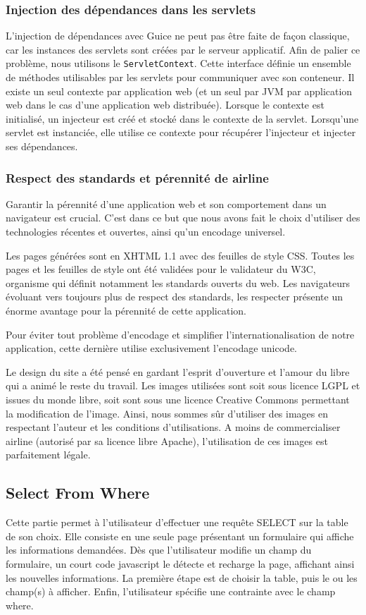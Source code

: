 \subsubsection{Injection des dépendances dans les servlets}
L'injection de dépendances avec Guice ne peut pas être faite de façon classique, car les instances des servlets sont créées par le serveur applicatif. 
Afin de palier ce problème, nous utilisons le \verb|ServletContext|. 
Cette  interface définie un ensemble de méthodes utilisables par les servlets pour communiquer avec son conteneur. 
Il existe un seul contexte par application web (et un seul par JVM par application web dans le cas d'une application web distribuée). 
Lorsque le contexte est initialisé, un injecteur est créé et stocké dans le contexte de la servlet. 
Lorsqu'une servlet est instanciée, elle utilise ce contexte pour récupérer l'injecteur et injecter ses dépendances.

\subsubsection{Respect des standards et pérennité de airline}
Garantir la pérennité d'une application web et son comportement dans un navigateur est crucial. C'est dans ce but que nous avons fait le choix d'utiliser des technologies récentes et ouvertes, ainsi qu'un encodage universel.

Les pages générées sont en XHTML 1.1 avec des feuilles de style CSS. Toutes les pages et les feuilles de style ont été validées pour le validateur du W3C, organisme qui définit notamment les standards ouverts du web. Les navigateurs évoluant vers toujours plus de respect des standards, les respecter présente un énorme avantage pour la pérennité de cette application.

Pour éviter tout problème d'encodage et simplifier l'internationalisation de notre application, cette dernière utilise exclusivement l'encodage unicode.

Le design du site a été pensé en gardant l'esprit d'ouverture et l'amour du libre qui a animé le reste du travail. 
Les images utilisées sont soit sous licence LGPL et issues du monde libre, soit sont sous une licence Creative Commons permettant la modification de l'image.
Ainsi, nous sommes sûr d'utiliser des images en respectant l'auteur et les conditions d'utilisations. A moins de commercialiser airline (autorisé par sa licence libre Apache), l'utilisation de ces images est parfaitement légale.

\subsection{Select From Where}
Cette partie permet à l'utilisateur d'effectuer une requête SELECT sur la table de son choix. Elle consiste en une seule page présentant un formulaire qui affiche les informations demandées. 
Dès que l'utilisateur modifie un champ du formulaire, un court code javascript le détecte et recharge la page, affichant ainsi les nouvelles informations. La première étape est de choisir la table, puis le ou les champ(s) à afficher. Enfin, l'utilisateur spécifie une contrainte avec le champ where.

